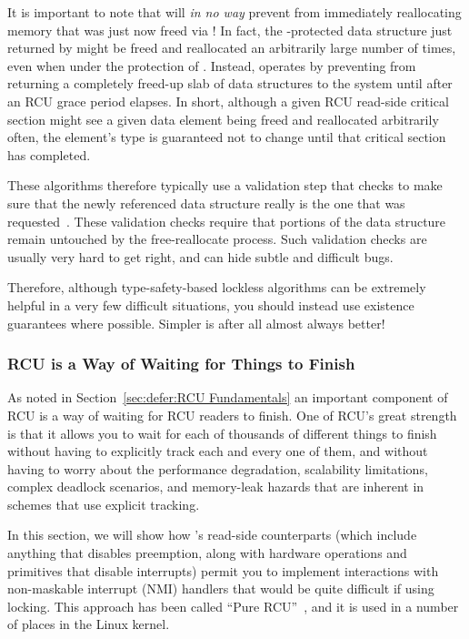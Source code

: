It is important to note that  will
\emph{in no way}
prevent  from immediately reallocating
memory that was just now freed via !
In fact, the -protected data structure
just returned by  might be freed and reallocated
an arbitrarily large number of times, even when under the protection
of .
Instead,  operates by preventing
from returning a completely freed-up slab of data structures
to the system until after an RCU grace period elapses.
In short, although a given RCU read-side critical section might see a
given  data element being freed and reallocated
arbitrarily often, the element's type is guaranteed not to change until
that critical section has completed.

These algorithms therefore typically use a validation step that checks
to make sure that the newly referenced data structure really is the one
that was requested~\cite[Section~2.5]{LaninShasha1986TSM}.
These validation checks require that portions of the data structure
remain untouched by the free-reallocate process.
Such validation checks are usually very hard to get right, and can
hide subtle and difficult bugs.

Therefore, although type-safety-based lockless algorithms can be extremely
helpful in a very few difficult situations, you should instead use existence
guarantees where possible.
Simpler is after all almost always better!

\subsubsection{RCU is a Way of Waiting for Things to Finish}
\label{sec:defer:RCU is a Way of Waiting for Things to Finish}

As noted in Section~\ref{sec:defer:RCU Fundamentals}
an important component
of RCU is a way of waiting for RCU readers to finish.
One of
RCU's great strength is that it allows you to wait for each of
thousands of different things to finish without having to explicitly
track each and every one of them, and without having to worry about
the performance degradation, scalability limitations, complex deadlock
scenarios, and memory-leak hazards that are inherent in schemes that
use explicit tracking.

In this section, we will show how 's
read-side counterparts (which include anything that disables preemption,
along with hardware operations and
primitives that disable interrupts) permit you to implement interactions with
non-maskable interrupt
(NMI) handlers that would be quite difficult if using locking.
This approach has been called ``Pure RCU''~\cite{PaulEdwardMcKenneyPhD},
and it is used in a number of places in the Linux kernel.

